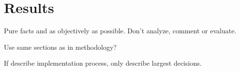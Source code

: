 \chapter{Results}\label{cha:Results}

Pure facts and as objectively as possible. Don't analyze, comment or evaluate.

Use same sections as in methodology?

If describe implementation process, only describe largest decisions.

%
%
%
%
%
%
%
%
%
%
%
%
%
%
